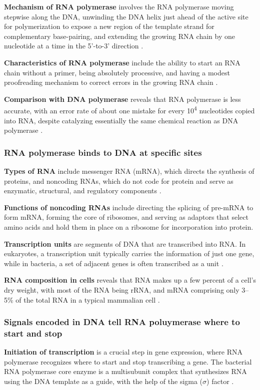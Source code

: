 \textbf{Mechanism of RNA polymerase} involves the RNA polymerase moving stepwise along the DNA, unwinding the DNA helix just ahead of the active site for polymerization to expose a new region of the template strand for complementary base-pairing, and extending the growing RNA chain by one nucleotide at a time in the 5'-to-3' direction \cite*{L1-Chapter6}.

\textbf{Characteristics of RNA polymerase} include the ability to start an RNA chain without a primer, being absolutely processive, and having a modest proofreading mechanism to correct errors in the growing RNA chain \cite*{L1-Chapter6}.

\textbf{Comparison with DNA polymerase} reveals that RNA polymerase is less accurate, with an error rate of about one mistake for every 10\textsuperscript{4} nucleotides copied into RNA, despite catalyzing essentially the same chemical reaction as DNA polymerase \cite*{L1-Chapter6}.

\subsubsection*{RNA polymerase binds to DNA at specific sites}
\textbf{Types of RNA} include messenger RNA (mRNA), which directs the synthesis of proteins, and noncoding RNAs, which do not code for protein and serve as enzymatic, structural, and regulatory components \cite*{L1-Chapter6}.

\textbf{Functions of noncoding RNAs} include directing the splicing of pre-mRNA to form mRNA, forming the core of ribosomes, and serving as adaptors that select amino acids and hold them in place on a ribosome for incorporation into protein\cite*{L1-Chapter6}.

\textbf{Transcription units} are segments of DNA that are transcribed into RNA. In eukaryotes, a transcription unit typically carries the information of just one gene, while in bacteria, a set of adjacent genes is often transcribed as a unit \cite*{L1-Chapter6}.

\textbf{RNA composition in cells} reveals that RNA makes up a few percent of a cell's dry weight, with most of the RNA being rRNA, and mRNA comprising only 3–5\% of the total RNA in a typical mammalian cell \cite*{L1-Chapter6}.

\subsubsection*{Signals encoded in DNA tell RNA poluymerase where to start and stop}
\textbf{Initiation of transcription} is a crucial step in gene expression, where RNA polymerase recognizes where to start and stop transcribing a gene. The bacterial RNA polymerase core enzyme is a multisubunit complex that synthesizes RNA using the DNA template as a guide, with the help of the sigma ($\sigma$) factor \cite*{L1-Chapter6}.

